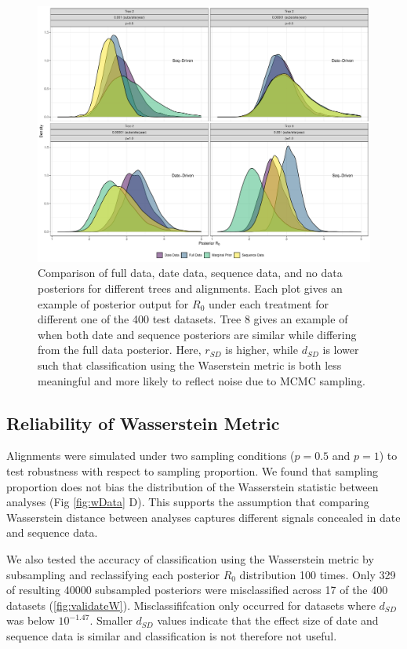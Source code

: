 \documentclass{article}
\begin{document}
\begin{figure}[H]
\centering
\includegraphics[width=1\linewidth]{figures/postEg.pdf}
\caption{Comparison of full data, date data, sequence data, and no data posteriors for different trees and alignments. Each plot gives an example of posterior output for $R_0$ under each treatment for different one of the 400 test datasets. Tree 8 gives an example of when both date and sequence posteriors are similar while differing from the full data posterior. Here, $r_{SD}$ is higher, while $d_{SD}$ is lower such that classification using the Waserstein metric is both less meaningful and more likely to reflect noise due to MCMC sampling.}
\label{fig:posts}
\end{figure}
\subsection*{Reliability of Wasserstein Metric}
Alignments were simulated under two sampling conditions ($p=0.5$ and $p=1$) to test robustness with respect to sampling proportion. We found that sampling proportion does not bias the distribution of the Wasserstein statistic between analyses (Fig \ref{fig:wData} D). This supports the assumption that comparing Wasserstein distance between analyses captures different signals concealed in date and sequence data. 

We also tested the accuracy of classification using the Wasserstein metric by subsampling and reclassifying each posterior $R_0$ distribution 100 times. Only 329 of resulting 40000 subsampled posteriors were misclassified  across 17 of the 400 datasets (\ref{fig:validateW}). Misclassififcation only occurred for datasets where $d_{SD}$ was below $10^{-1.47}$. Smaller $d_{SD}$ values indicate that the effect size of date and sequence data is similar and classification is not therefore not useful.
\end{document}
